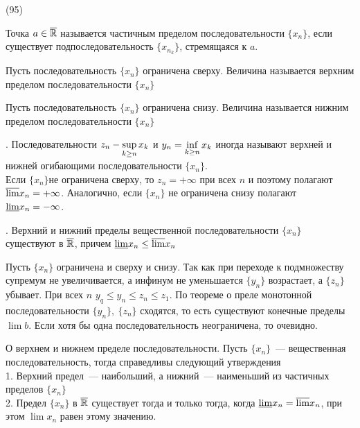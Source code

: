 (95)

\Op Точка $a \in \overline{\mathbb{R}}$ называется частичным пределом последовательности $\{x_n\}$, если существует подпоследовательность $\{x_{n_k}\}$, стремящаяся к $a$.

\Op Пусть последовательность $\{x_n\}$ ограничена сверху. Величина
 называется верхним пределом последовательности $\{x_n\}$

Пусть последовательность $\{x_n\}$ ограничена снизу. Величина
 называется нижним пределом последовательности $\{x_n\}$

. Последовательности $z_n - \displaystyle \sup\limits^{}_{k \ge n} x_k$ и $y_n = \displaystyle \inf\limits^{}_{k \ge n} x_k$ иногда называют верхней и нижней огибающими последовательности $\{x_n\}$.\\
Если $\{x_n\}$не ограничена сверху, то $z_n = +\infty$ при всех $n$ и поэтому полагают $\overline{\lim} x_n = +\infty$. Аналогично, если $\{x_n\}$ не ограничена снизу полагают $\underline{\lim} x_n = -\infty$.

. Верхний и нижний пределы вещественной последовательности $\{x_n\}$ существуют в $\overline{\mathbb{R}}$, причем $\underline{\lim} x_n \le \overline{\lim}x_n$

\D Пусть $\{x_n\}$ ограничена и сверху и снизу. Так как при переходе к подмножеству супремум не увеличивается, а инфинум не уменьшается $\{y_n\}$ возрастает, а $\{z_n\}$ убывает. При всех $n$ $y_q \le y_n \le z_n \le z_1$. По теореме о преле монотонной последовательности $\{y_n\},\ \{z_n\}$ сходятся, то есть существуют конечные пределы $\lim b$. Если хотя бы одна последовательность неограничена, то очевидно.

\T \q О верхнем и нижнем пределе последовательности. Пусть $\{x_n\}$~--- вещественная последовательность, тогда справедливы следующий утверждения\\
1. Верхний предел~--- наибольший, а нижний~--- наименьший из частичных пределов $\{x_n\}$\\
2. Предел $\{x_n\}$ в $\overline{\mathbb{R}}$ существует тогда и только тогда, когда $\underline{\lim} x_n = \overline{\lim} x_n$, при этом $\lim x_n$ равен этому значению.

